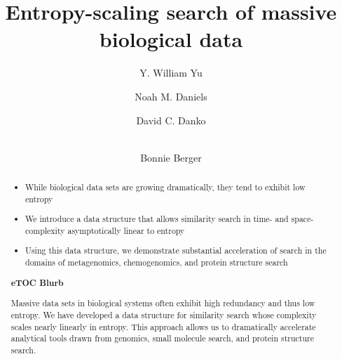 \documentclass[review,preprint,12pt]{elsarticle}
\theoremstyle{definition}
\theoremstyle{remark}
\numberwithin{equation}{section}
\begin{document}
\begin{frontmatter}

\title{ %
Entropy-scaling search of massive biological data}

\author[mitmath,mitcsail]{Y. William Yu}
\author[mitmath,mitcsail]{Noah M. Daniels}
\author[mitcsail]{David C. Danko}
\author[mitmath,mitcsail]{\\Bonnie Berger}
\address[mitmath]{Department of Mathematics, Massachusetts Institute of Technology, Cambridge, Massachusetts 02139}
\address[mitcsail]{Computer Science and AI Lab, Massachusetts Institute of Technology, Cambridge, Massachusetts 02139}






\begin{abstract}
    \begin{itemize}
        \item While biological data sets are growing dramatically, they tend to exhibit low entropy
        \item We introduce a data structure that allows similarity search in time- and space-complexity asymptotically linear to entropy
        \item Using this data structure, we demonstrate substantial acceleration of search in the domains of metagenomics, chemogenomics, and protein structure search
    \end{itemize}
\noindent\unskip\textbf{eTOC Blurb}
\par\medskip\noindent\unskip\ignorespaces
Massive data sets in biological systems often exhibit high redundancy and thus low entropy.
We have developed a data structure for similarity search whose complexity scales nearly linearly in entropy.
This approach allows us to dramatically accelerate analytical tools drawn from genomics, small molecule search, and protein structure search.
\end{abstract}

\end{frontmatter}
\end{document}

